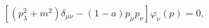 \begin{equation}
 \left[\left(p_\lambda^2+m^2\right)\delta_{\mu\nu}-(1-a)p_\mu p_\nu
\right]\varphi_\nu (p)=0 , \label{6}
\end{equation}

